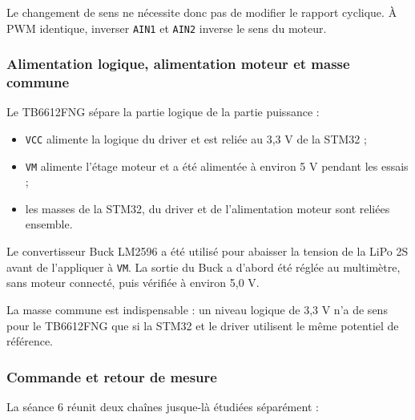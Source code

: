 \documentclass[11pt,a4paper]{article}
\begin{document}
	Le changement de sens ne nécessite donc pas de modifier le rapport cyclique. À PWM identique, inverser \texttt{AIN1} et \texttt{AIN2} inverse le sens du moteur.
	
	\subsubsection*{Alimentation logique, alimentation moteur et masse commune}
	
	Le TB6612FNG sépare la partie logique de la partie puissance :
	
	\begin{itemize}
		\item \texttt{VCC} alimente la logique du driver et est reliée au 3,3 V de la STM32 ;
		\item \texttt{VM} alimente l'étage moteur et a été alimentée à environ 5 V pendant les essais ;
		\item les masses de la STM32, du driver et de l'alimentation moteur sont reliées ensemble.
	\end{itemize}
	
	Le convertisseur Buck LM2596 a été utilisé pour abaisser la tension de la LiPo 2S avant de l'appliquer à \texttt{VM}. La sortie du Buck a d'abord été réglée au multimètre, sans moteur connecté, puis vérifiée à environ 5,0 V.
	
	La masse commune est indispensable : un niveau logique de 3,3 V n'a de sens pour le TB6612FNG que si la STM32 et le driver utilisent le même potentiel de référence.
	
	\begin{center}
	\end{center}
	
	\subsubsection*{Commande et retour de mesure}
	
	La séance 6 réunit deux chaînes jusque-là étudiées séparément :
	
	\begin{center}
	\end{center}
	
\end{document}
